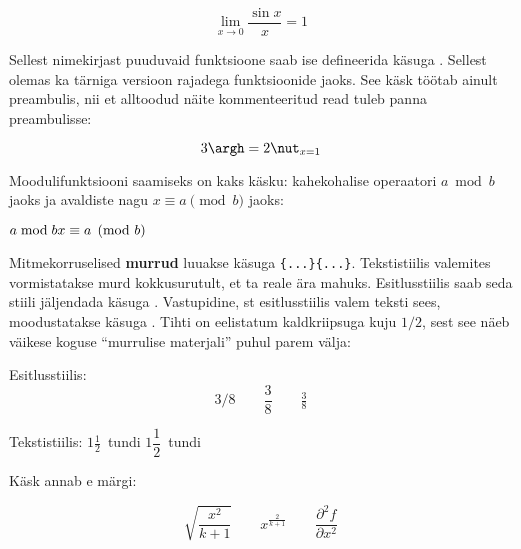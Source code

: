 \begin{example}
\begin{equation*}
  \lim_{x \rightarrow 0}
  \frac{\sin x}{x}=1
\end{equation*}
\end{example}

Sellest nimekirjast puuduvaid funktsioone saab ise defineerida käsuga
. Sellest olemas ka tärniga versioon rajadega
funktsioonide jaoks. See käsk
töötab ainult preambulis, nii et alltoodud näite kommenteeritud read
tuleb panna preambulisse:
\begin{example}
\begin{equation*}
  3\argh = 2\nut_{x=1}
\end{equation*}
\end{example}

Moodulifunktsiooni saamiseks on kaks käsku:
 kahekohalise operaatori $a \bmod b$ jaoks ja 
avaldiste nagu $x\equiv a \pmod{b}$ jaoks:
\begin{example}
$a\bmod b \\
 x\equiv a \pmod{b}$
\end{example}

Mitmekorruselised \textbf{murrud} luuakse käsuga
\verb|{...}{...}|.
Tekstistiilis valemites
vormistatakse murd kokkusurutult, et ta reale ära mahuks. Esitlusstiilis
saab seda stiili jäljendada käsuga . Vastupidine, st
esitlusstiilis valem teksti sees, moodustatakse käsuga . Tihti
on eelistatum kaldkriipsuga kuju $1/2$, sest see näeb väikese koguse
"`murrulise materjali"' puhul parem välja:
\begin{example}
Esitlusstiilis:
\begin{equation*}
  3/8 \qquad \frac{3}{8}
  \qquad \tfrac{3}{8}
\end{equation*}
\end{example}

\begin{example}
Tekstistiilis:
$1\frac{1}{2}$~tundi \qquad
$1\dfrac{1}{2}$~tundi
\end{example}

Käsk  annab e märgi:
\begin{example}
\begin{equation*}
  \sqrt{\frac{x^2}{k+1}}\qquad
  x^\frac{2}{k+1}\qquad
  \frac{\partial^2f}
  {\partial x^2}
\end{equation*}
\end{example}

